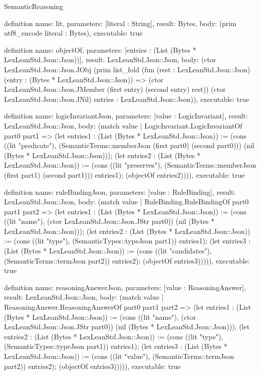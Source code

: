 \begin{lexlean}{SemanticReasoning}
\begin{semanticmodule}
definition{
  name: lit,
  parameters: [literal : String],
  result: Bytes,
  body: (prim utf8_encode literal : Bytes),
  executable: true
}

definition{
  name: objectOf,
  parameters: [entries : (List (Bytes * LexLeanStd.Json::Json))],
  result: LexLeanStd.Json::Json,
  body: (ctor LexLeanStd.Json::Json.JObj (prim list_fold (fun (rest : LexLeanStd.Json::Json) (entry : (Bytes * LexLeanStd.Json::Json)) => (ctor LexLeanStd.Json::Json.JMember (first entry) (second entry) rest)) (ctor LexLeanStd.Json::Json.JNil) entries : LexLeanStd.Json::Json)),
  executable: true
}

definition{
  name: logicInvariantJson,
  parameters: [value : LogicInvariant],
  result: LexLeanStd.Json::Json,
  body: (match value
    | LogicInvariant.LogicInvariantOf part0 part1 => (let entries1 : (List (Bytes * LexLeanStd.Json::Json)) := (cons ((lit "predicate"), (SemanticTerms::memberJson (first part0) (second part0))) (nil (Bytes * LexLeanStd.Json::Json))); (let entries2 : (List (Bytes * LexLeanStd.Json::Json)) := (cons ((lit "preserves"), (SemanticTerms::memberJson (first part1) (second part1))) entries1); (objectOf entries2)))),
  executable: true
}

definition{
  name: ruleBindingJson,
  parameters: [value : RuleBinding],
  result: LexLeanStd.Json::Json,
  body: (match value
    | RuleBinding.RuleBindingOf part0 part1 part2 => (let entries1 : (List (Bytes * LexLeanStd.Json::Json)) := (cons ((lit "name"), (ctor LexLeanStd.Json::Json.JStr part0)) (nil (Bytes * LexLeanStd.Json::Json))); (let entries2 : (List (Bytes * LexLeanStd.Json::Json)) := (cons ((lit "type"), (SemanticTypes::typeJson part1)) entries1); (let entries3 : (List (Bytes * LexLeanStd.Json::Json)) := (cons ((lit "candidates"), (SemanticTerms::termJson part2)) entries2); (objectOf entries3))))),
  executable: true
}

definition{
  name: reasoningAnswerJson,
  parameters: [value : ReasoningAnswer],
  result: LexLeanStd.Json::Json,
  body: (match value
    | ReasoningAnswer.ReasoningAnswerOf part0 part1 part2 => (let entries1 : (List (Bytes * LexLeanStd.Json::Json)) := (cons ((lit "name"), (ctor LexLeanStd.Json::Json.JStr part0)) (nil (Bytes * LexLeanStd.Json::Json))); (let entries2 : (List (Bytes * LexLeanStd.Json::Json)) := (cons ((lit "type"), (SemanticTypes::typeJson part1)) entries1); (let entries3 : (List (Bytes * LexLeanStd.Json::Json)) := (cons ((lit "value"), (SemanticTerms::termJson part2)) entries2); (objectOf entries3))))),
  executable: true
}


\end{semanticmodule}
\end{lexlean}
